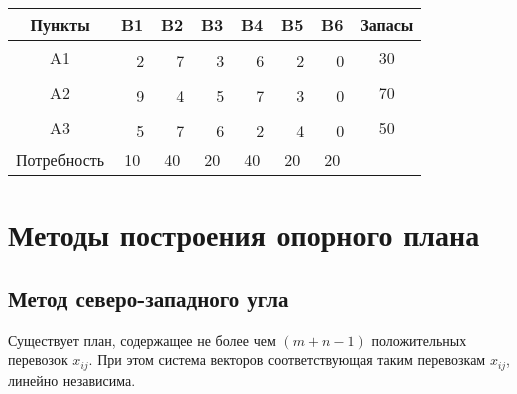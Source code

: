 \documentclass[a4paper,12pt]{article}
\begin{document}
	\begin{center}
		\begin{tabular}{|c|c|c|c|c|c|c|c|c|c|c|c|l|c}
			\hline
			Пункты & \multicolumn{2}{c|}{B1} & \multicolumn{2}{c|}{B2} & \multicolumn{2}{c|}{B3} & \multicolumn{2}{c|}{B4} & \multicolumn{2}{c|}{B5} & \multicolumn{2}{c|}{B6} & \multicolumn{1}{c|}{Запасы} \\ \hline
			\multirow{2}{*}{A1} & \multicolumn{2}{c|}{\textbf{}} & \multicolumn{2}{c|}{} & \multicolumn{2}{c|}{} & \multicolumn{2}{c|}{} & \multicolumn{2}{c|}{} & \multicolumn{2}{c|}{} & \multicolumn{1}{c|}{\multirow{2}{*}{30}} \\ \cline{2-13}
			&  & 2 &  & 7 &  & 3 &  & 6 &  & 2 &  & 0 & \multicolumn{1}{c|}{} \\ \hline
			\multirow{2}{*}{A2} & \multicolumn{2}{c|}{\textbf{}} & \multicolumn{2}{c|}{\textbf{}} & \multicolumn{2}{c|}{} & \multicolumn{2}{c|}{} & \multicolumn{2}{c|}{} & \multicolumn{2}{c|}{} & \multicolumn{1}{c|}{\multirow{2}{*}{70}} \\ \cline{2-13}
			&  & 9 &  & 4 &  & 5 &  & 7 &  & 3 &  & 0 & \multicolumn{1}{c|}{} \\ \hline
			\multirow{2}{*}{A3} & \multicolumn{2}{c|}{} & \multicolumn{2}{c|}{\textbf{}} & \multicolumn{2}{c|}{\textbf{}} & \multicolumn{2}{c|}{} & \multicolumn{2}{c|}{} & \multicolumn{2}{c|}{} & \multicolumn{1}{c|}{\multirow{2}{*}{50}} \\ \cline{2-13}
			&  & 5 &  & 7 &  & 6 &  & 2 &  & 4 &  & 0 & \multicolumn{1}{c|}{} \\ \hline
			Потребность & \multicolumn{2}{c|}{10} & \multicolumn{2}{c|}{40} & \multicolumn{2}{c|}{20} & \multicolumn{2}{c|}{40} & \multicolumn{2}{c|}{20} & \multicolumn{2}{c|}{20} &  \\ \cline{1-13}
		\end{tabular}
	\end{center}

	\clearpage

\section{Методы построения опорного плана}
	\subsection{Метод северо-западного угла}
	\begin{theorem}
		Существует план, содержащее не более чем $(m + n - 1)$ положительных перевозок $x_{ij}$. При этом система векторов соответствующая таким перевозкам $x_{ij}$, линейно независима. 
	\end{theorem}
\end{document}
